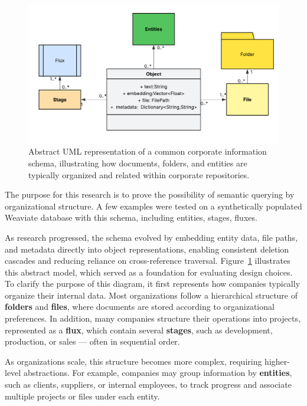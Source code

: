 \begin{figure}[h!]
    \centering
    \includegraphics[width=1\linewidth]{Images/Classe UML.png}
    \caption{Abstract UML representation of a common corporate information schema, illustrating how documents, folders, and entities are typically organized and related within corporate repositories.}\label{fig:weaviate_class}
\end{figure}

The purpose for this research is to prove the possibility of semantic querying by organizational structure. A few examples were tested on a synthetically populated Weaviate database with this schema, including entities, stages, fluxes.

As research progressed, the schema evolved by embedding entity data, file paths, and metadata directly into object representations, enabling consistent deletion cascades and reducing reliance on cross-reference traversal. Figure~\ref{fig:weaviate_class} illustrates this abstract model, which served as a foundation for evaluating design choices. 
To clarify the purpose of this diagram, it first represents how companies typically organize their internal data. Most organizations follow a hierarchical structure of \textbf{folders} and \textbf{files}, where documents are stored according to organizational preferences. In addition, many companies structure their operations into projects, represented as a \textbf{flux}, which contain several \textbf{stages}, such as development, production, or sales — often in sequential order.

As organizations scale, this structure becomes more complex, requiring higher-level abstractions. For example, companies may group information by \textbf{entities}, such as clients, suppliers, or internal employees, to track progress and associate multiple projects or files under each entity.


